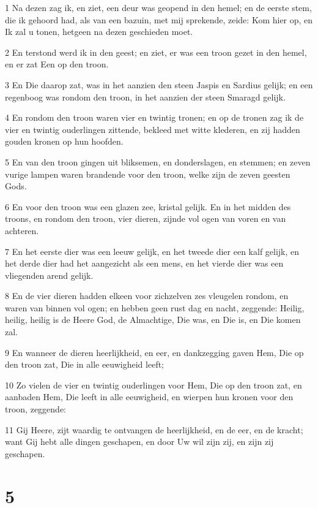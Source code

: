 \par 1 Na dezen zag ik, en ziet, een deur was geopend in den hemel; en de eerste stem, die ik gehoord had, als van een bazuin, met mij sprekende, zeide: Kom hier op, en Ik zal u tonen, hetgeen na dezen geschieden moet.
\par 2 En terstond werd ik in den geest; en ziet, er was een troon gezet in den hemel, en er zat Een op den troon.
\par 3 En Die daarop zat, was in het aanzien den steen Jaspis en Sardius gelijk; en een regenboog was rondom den troon, in het aanzien der steen Smaragd gelijk.
\par 4 En rondom den troon waren vier en twintig tronen; en op de tronen zag ik de vier en twintig ouderlingen zittende, bekleed met witte klederen, en zij hadden gouden kronen op hun hoofden.
\par 5 En van den troon gingen uit bliksemen, en donderslagen, en stemmen; en zeven vurige lampen waren brandende voor den troon, welke zijn de zeven geesten Gods.
\par 6 En voor den troon was een glazen zee, kristal gelijk. En in het midden des troons, en rondom den troon, vier dieren, zijnde vol ogen van voren en van achteren.
\par 7 En het eerste dier was een leeuw gelijk, en het tweede dier een kalf gelijk, en het derde dier had het aangezicht als een mens, en het vierde dier was een vliegenden arend gelijk.
\par 8 En de vier dieren hadden elkeen voor zichzelven zes vleugelen rondom, en waren van binnen vol ogen; en hebben geen rust dag en nacht, zeggende: Heilig, heilig, heilig is de Heere God, de Almachtige, Die was, en Die is, en Die komen zal.
\par 9 En wanneer de dieren heerlijkheid, en eer, en dankzegging gaven Hem, Die op den troon zat, Die in alle eeuwigheid leeft;
\par 10 Zo vielen de vier en twintig ouderlingen voor Hem, Die op den troon zat, en aanbaden Hem, Die leeft in alle eeuwigheid, en wierpen hun kronen voor den troon, zeggende:
\par 11 Gij Heere, zijt waardig te ontvangen de heerlijkheid, en de eer, en de kracht; want Gij hebt alle dingen geschapen, en door Uw wil zijn zij, en zijn zij geschapen.

\chapter{5}

